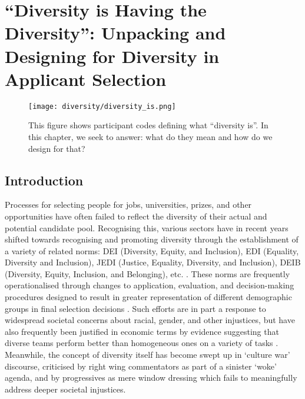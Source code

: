 

\chapter{\label{ch:diversity}``Diversity is Having the Diversity'': Unpacking and Designing for Diversity in Applicant Selection}

\minitoc

\begin{figure}
    \texttt{[image: diversity/diversity\_is.png]}
    \caption{This figure shows participant codes defining what ``diversity is''. In this chapter, we seek to answer: what do they mean and how do we design for that?}
    \label{fig:diversity_is_teaser}
\end{figure}
  
\section{Introduction}\label{sec:divintro}
Processes for selecting people for jobs, universities, prizes, and other opportunities have often failed to reflect the diversity of their actual and potential candidate pool. Recognising this, various sectors have in recent years shifted towards recognising and promoting diversity through the establishment of a variety of related norms: DEI (Diversity, Equity, and Inclusion), EDI (Equality, Diversity and Inclusion), JEDI (Justice, Equality, Diversity, and Inclusion), DEIB (Diversity, Equity, Inclusion, and Belonging), etc. \cite{pinkett2023data,hsieh2019allocation,minkin2023diversity}. These norms are frequently operationalised through changes to application, evaluation, and decision-making procedures designed to result in greater representation of different demographic groups in final selection decisions \cite{pinkett2023data}. Such efforts are in part a response to widespread societal concerns about racial, gender, and other injustices, but have also frequently been justified in economic terms by evidence suggesting that diverse teams perform better than homogeneous ones on a variety of tasks \cite{deming2017growing,page_diversity_2017,noray2023systemic}. Meanwhile, the concept of diversity itself has become swept up in `culture war' discourse, criticised by right wing commentators as part of a sinister `woke' agenda, and by progressives as mere window dressing which fails to meaningfully address deeper societal injustices. 

